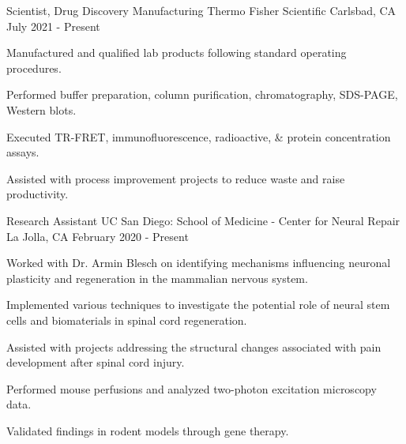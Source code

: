 \begin{cventries}
\cventry
    {Scientist, Drug Discovery Manufacturing} %
    {Thermo Fisher Scientific} %
    {Carlsbad, CA} %
    {July 2021 - Present} %
    {
      \begin{cvitems} %
        \item {Manufactured and qualified lab products following standard operating procedures.}
        \item {Performed buffer preparation, column purification, chromatography, SDS-PAGE, Western blots.}
        \item {Executed TR-FRET, immunofluorescence, radioactive, \& protein concentration assays.}
        \item {Assisted with process improvement projects to reduce waste and raise productivity.}
      \end{cvitems}
    }
\cventry
{Research Assistant} %
{UC San Diego: School of Medicine - Center for Neural Repair} %
{La Jolla, CA} %
{February 2020 - Present} %
{
  \begin{cvitems} %
    \item {Worked with Dr. Armin Blesch on identifying mechanisms influencing neuronal plasticity and regeneration in the mammalian nervous system.}
    \item {Implemented various techniques to investigate the potential role of neural stem cells and biomaterials in spinal cord regeneration.}
    \item {Assisted with projects addressing the structural changes associated with pain development after spinal cord injury.}
    \item {Performed mouse perfusions and analyzed two-photon excitation microscopy data.}
    \item {Validated findings in rodent models through gene therapy.}
  \end{cvitems}
}

\end{cventries}
